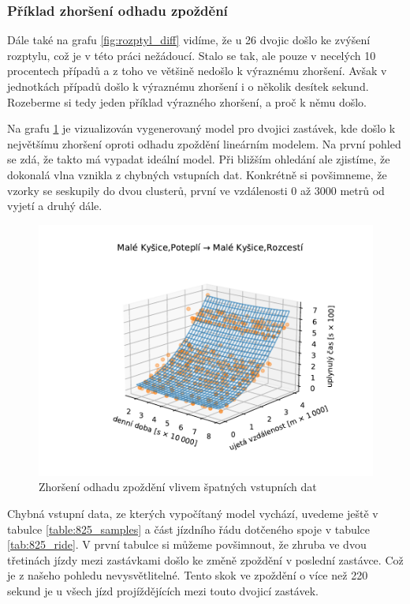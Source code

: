 \subsubsection{Příklad zhoršení odhadu zpoždění}




Dále také na grafu \ref{fig:rozptyl_diff} vidíme, že u 26 dvojic došlo ke zvýšení rozptylu, což je v této práci nežádoucí. Stalo se tak, ale pouze v necelých 10 procentech případů a z toho ve většině nedošlo k výraznému zhoršení. Avšak v jednotkách případů došlo k výraznému zhoršení i o několik desítek sekund. Rozeberme si tedy jeden příklad výrazného zhoršení, a proč k němu došlo.


\bigbreak


Na grafu \ref{fig:chyba} je vizualizován vygenerovaný model pro dvojici zastávek, kde došlo k největšímu zhoršení oproti odhadu zpoždění lineárním modelem. Na první pohled se zdá, že takto má vypadat ideální model. Při bližším ohledání ale zjistíme, že dokonalá vlna vznikla z chybných vstupních dat. Konkrétně si povšimneme, že vzorky se seskupily do dvou clusterů, první ve vzdálenosti 0 až 3000 metrů od vyjetí a druhý dále.


\begin{figure}
   \centering
 \includegraphics[width=1\linewidth]{../img/808_809}
 \caption{Zhoršení odhadu zpoždění vlivem špatných vstupních dat}
 \label{fig:chyba}
\end{figure}


Chybná vstupní data, ze kterých vypočítaný model vychází, uvedeme ještě v tabulce \ref{table:825_samples} a část jízdního řádu dotčeného spoje v tabulce \ref{tab:825_ride}. V první tabulce si můžeme povšimnout, že zhruba ve dvou třetinách jízdy mezi zastávkami došlo ke změně zpoždění v poslední zastávce. Což je z našeho pohledu nevysvětlitelné. Tento skok ve zpoždění o více než 220 sekund je u všech jízd projíždějících mezi touto dvojicí zastávek.


